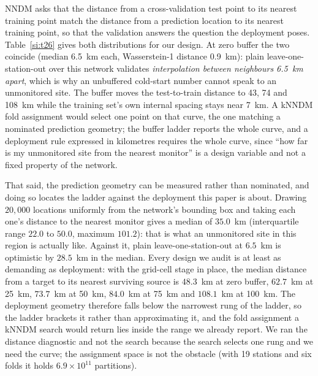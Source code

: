 \documentclass[11pt]{article}
\begin{document}
NNDM asks that the distance from a cross-validation test point to its nearest training
point match the distance from a prediction location to its nearest training point, so that
the validation answers the question the deployment poses. Table~\ref{si:t26} gives both
distributions for our design. At zero buffer the two coincide (median 6.5~km each,
Wasserstein-1 distance 0.9~km): plain leave-one-station-out over this network validates
\emph{interpolation between neighbours 6.5~km apart}, which is why an unbuffered cold-start
number cannot speak to an unmonitored site. The buffer moves the test-to-train distance to
43, 74 and 108~km while the training set's own internal spacing stays near 7~km. A kNNDM
fold assignment would select one point on that curve, the one matching a nominated
prediction geometry; the buffer ladder reports the whole curve, and a deployment
rule expressed in kilometres requires the whole curve, since ``how far is my unmonitored site from the
nearest monitor'' is a design variable and not a fixed property of the network.

That said, the prediction geometry can be measured rather than nominated, and doing so
locates the ladder against the deployment this paper is about. Drawing $20{,}000$ locations
uniformly from the network's bounding box and taking each one's distance to the nearest
monitor gives a median of $35.0$~km (interquartile range $22.0$ to $50.0$, maximum
$101.2$): that is what an unmonitored site in this region is actually like. Against it,
plain leave-one-station-out at $6.5$~km is optimistic by $28.5$~km in the median. Every
design we audit is at least as demanding as deployment: with the grid-cell stage in place,
the median distance from a target to its nearest surviving source is $48.3$~km at zero
buffer, $62.7$~km at 25~km, $73.7$~km at 50~km, $84.0$~km at 75~km and $108.1$~km at
100~km. The deployment geometry therefore falls below the narrowest rung of the ladder,
so the ladder brackets it rather than approximating it, and the fold assignment a kNNDM
search would return lies inside the range we already report. We ran the distance
diagnostic and not the search because the search selects one rung and we need the curve;
the assignment space is not the obstacle (with 19 stations and six folds it holds
$6.9\times10^{11}$ partitions).
\end{document}
